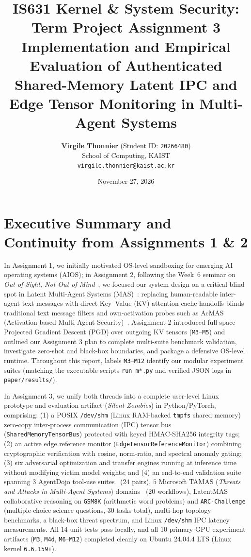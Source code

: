 \documentclass[11pt]{article}
\title{\textbf{IS631 Kernel \& System Security: Term Project Assignment 3}\\
\large Implementation and Empirical Evaluation of Authenticated Shared-Memory Latent IPC and Edge Tensor Monitoring in Multi-Agent Systems}
\author{%
  \textbf{Virgile Thonnier} (Student ID: \texttt{20266480})\\
  School of Computing, KAIST\\
  \texttt{virgile.thonnier@kaist.ac.kr}
}
\date{November 27, 2026}
\begin{document}
\maketitle

\section{Executive Summary and Continuity from Assignments 1 \& 2}
In Assignment 1, we initially motivated OS-level sandboxing for emerging AI operating systems (AIOS); in Assignment 2, following the Week~6 seminar on \emph{Out of Sight, Not Out of Mind}~\cite{outofsight}, we focused our system design on a critical blind spot in Latent Multi-Agent Systems (MAS)~\cite{latentmas,c2c}: replacing human-readable inter-agent text messages with direct Key--Value (KV) attention-cache handoffs blinds traditional text message filters and own-activation probes such as AcMAS (Activation-based Multi-Agent Security)~\cite{acmas}. Assignment 2 introduced full-space Projected Gradient Descent (PGD) over outgoing KV tensors (\texttt{M3}--\texttt{M5}) and outlined our Assignment 3 plan to complete multi-suite benchmark validation, investigate zero-shot and black-box boundaries, and package a defensive OS-level runtime. Throughout this report, labels \texttt{M3}--\texttt{M12} identify our modular experiment suites (matching the executable scripts \texttt{run\_m*.py} and verified JSON logs in \texttt{paper/results/}).

In Assignment 3, we unify both threads into a complete user-level Linux prototype and evaluation artifact (\emph{Silent Zombies}) in Python/PyTorch, comprising: (1) a POSIX \texttt{/dev/shm} (Linux RAM-backed \texttt{tmpfs} shared memory) zero-copy inter-process communication (IPC) tensor bus (\texttt{SharedMemoryTensorBus}) protected with keyed HMAC-SHA256 integrity tags; (2) an active edge reference monitor (\texttt{EdgeTensorReferenceMonitor}) combining cryptographic verification with cosine, norm-ratio, and spectral anomaly gating; (3) six adversarial optimization and transfer engines running at inference time without modifying victim model weights; and (4) an end-to-end validation suite spanning $3$ AgentDojo tool-use suites~\cite{agentdojo} ($24$ pairs), $5$ Microsoft TAMAS (\emph{Threats and Attacks in Multi-Agent Systems}) domains~\cite{tamas} ($20$ workflows), LatentMAS~\cite{latentmas} collaborative reasoning on \texttt{GSM8K} (arithmetic word problems) and \texttt{ARC-Challenge} (multiple-choice science questions, $30$ tasks total), multi-hop topology benchmarks, a black-box threat spectrum, and Linux \texttt{/dev/shm} IPC latency measurements. All $14$ unit tests pass locally, and all $10$ primary GPU experiment artifacts (\texttt{M3}, \texttt{M4d}, \texttt{M6}--\texttt{M12}) completed cleanly on Ubuntu 24.04.4 LTS (Linux kernel \texttt{6.6.159+}).
\end{document}
